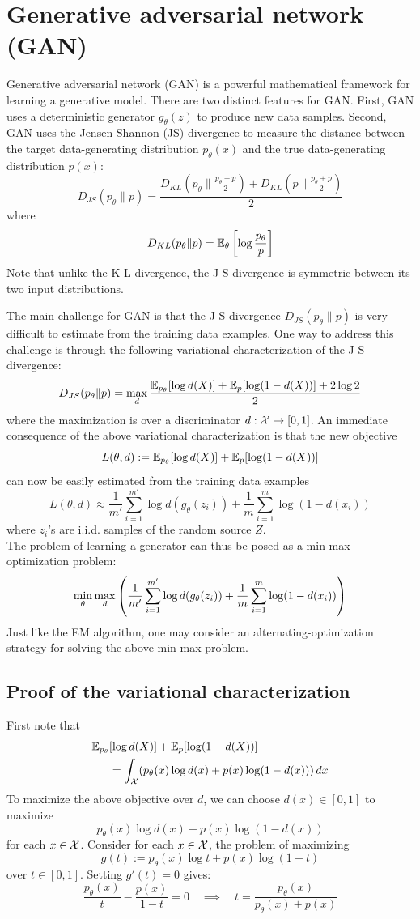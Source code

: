 \documentclass[11pt]{book}
\begin{document}
\section{Generative adversarial network (GAN)}
Generative adversarial network (GAN) is a powerful mathematical framework for learning a generative model. There are two distinct features for GAN. First, GAN uses a deterministic generator $g_\theta(z)$ to produce new data samples. 
Second, GAN uses the Jensen-Shannon (JS) divergence to measure the distance between the target data-generating distribution $p_\theta(x)$ and the true data-generating distribution $p(x)$:
\[
  D_{JS}(p_\theta \| p) = \frac{D_{KL}(p_\theta \| \frac{p_\theta + p}{2}) + D_{KL}(p \| \frac{p_\theta + p}{2})}{2}
\]
where 
\[
  D_{KL}(p_\theta \| p) = \mathbb{E}_\theta \left[ \log \frac{p_\theta}{p} \right]
\]
Note that unlike the K-L divergence, the J-S divergence is symmetric between its two input distributions. 

The main challenge for GAN is that the J-S divergence $D_{JS}(p_\theta \| p)$ is very difficult to estimate from the training data examples. One way to address this challenge is through the following variational characterization of the J-S divergence: 
\[
  D_{JS}(p_\theta \| p) = \max_{d} \frac{\mathbb{E}_{p_{\theta}}[\log d(X)] + \mathbb{E}_p [\log(1 - d(X))] + 2\log 2}{2}
\]
where the maximization is over a discriminator $d : \mathcal{X} \to [0, 1]$. An immediate consequence of the above variational 
characterization is that the new objective 
\[
  L(\theta, d) := \mathbb{E}_{p_\theta} [\log d(X)] + \mathbb{E}_p [\log(1 - d(X))]
\] 
can now be easily estimated from the training data examples 
\[
  L(\theta, d) \approx \frac{1}{m'} \sum_{i=1}^{m'} \log d(g_\theta(z_i)) + \frac{1}{m} \sum_{i=1}^m \log(1 - d(x_i)) 
\] 
where $z_i$'s are i.i.d. samples of the random source $Z$. \\ 

\noindent The problem of learning a generator can thus be posed as a min-max optimization problem: 
\[
  \min_{\theta} \max_{d} \left( \frac{1}{m'} \sum_{i=1}^{m'} \log d(g_\theta(z_i)) + \frac{1}{m} \sum_{i=1}^{m} \log(1 - d(x_i))  \right)
\]
Just like the EM algorithm, one may consider an alternating-optimization strategy for solving the above min-max problem.

\subsection{Proof of the variational characterization}
First note that 
\begin{align*}
  \mathbb{E}_{p_\theta} &[\log d(X)] + \mathbb{E}_p[\log(1-d(X))] \\ 
                &= \int_{\mathcal{X}} (p_\theta(x) \log d(x) + p(x) \log (1 - d(x))) \, dx 
\end{align*}
To maximize the above objective over $d$, we can choose $d(x) \in [0,1]$ to maximize 
\[
  p_\theta(x) \log d(x) + p(x) \log (1 - d(x))
\] 
for each $x \in \mathcal{X}$. Consider for each $x \in \mathcal{X}$, the problem of maximizing 
\[
  g(t) := p_\theta(x) \log t + p(x) \log (1 - t)
\] 
over $t \in [0,1]$. Setting $g'(t) = 0$ gives: 
\[
  \frac{p_\theta(x)}{t} - \frac{p(x)}{1-t} = 0 \quad\implies\quad t = \frac{p_\theta(x)}{p_\theta(x) + p(x)}
\]
\end{document}
